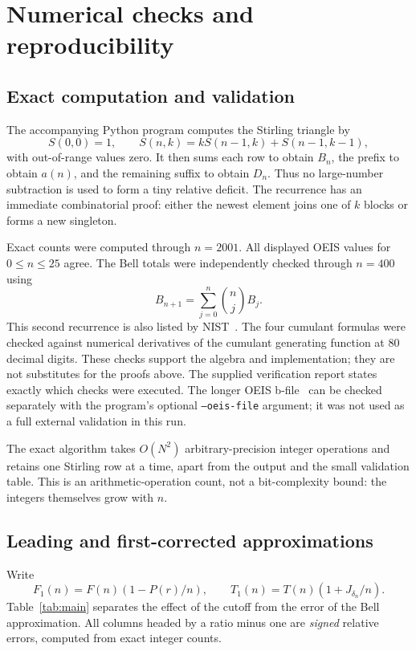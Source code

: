 \documentclass[11pt,a4paper]{article}
\numberwithin{equation}{section}
\theoremstyle{remark}
\begin{document}
\section{Numerical checks and reproducibility}\label{sec:numerics}

\subsection{Exact computation and validation}
The accompanying Python program computes the Stirling triangle by
\begin{equation}\label{eq:recurrence}
 S(0,0)=1,\qquad
 S(n,k)=kS(n-1,k)+S(n-1,k-1),
\end{equation}
with out-of-range values zero. It then sums each row to obtain $B_n$, the
prefix to obtain $a(n)$, and the remaining suffix to obtain $D_n$. Thus no
large-number subtraction is used to form a tiny relative deficit.
The recurrence has an immediate combinatorial proof: either the newest
element joins one of $k$ blocks or forms a new singleton.

Exact counts were computed through $n=2001$. All displayed OEIS values
for $0\le n\le25$ agree. The Bell totals were independently checked
through $n=400$ using
\[
 B_{n+1}=\sum_{j=0}^n\binom nj B_j.
\]
This second recurrence is also listed by NIST~\cite{dlmf-bell}.
The four cumulant formulas were checked against numerical derivatives
of the cumulant generating function at 80 decimal digits. These checks
support the algebra and implementation; they are not substitutes for
the proofs above. The supplied verification report states exactly which
checks were executed. The longer OEIS b-file~\cite{oeis-bfile} can be
checked separately with the program's optional \texttt{--oeis-file}
argument; it was not used as a full external validation in this run.

The exact algorithm takes $O(N^2)$ arbitrary-precision integer operations
and retains one Stirling row at a time, apart from the output and the
small validation table. This is an arithmetic-operation count, not a
bit-complexity bound: the integers themselves grow with $n$.

\subsection{Leading and first-corrected approximations}
Write
\[
 F_1(n)=F(n)(1-P(r)/n),\qquad
 T_1(n)=T(n)(1+J_{\delta_n}/n).
\]
Table~\ref{tab:main} separates the effect of the cutoff from the error of
the Bell approximation. All columns headed by a ratio minus one are
\emph{signed} relative errors, computed from exact integer counts.
\end{document}
